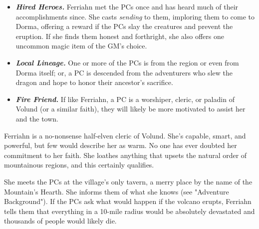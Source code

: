 \documentclass[10pt,a4paper,twoside,bg=print,twocolumn,openany,nodeprecatedcode]{dndbook}
\begin{document}
\begin{itemize}
\item \textbf{\textit{Hired Heroes.}} Ferriahn met the PCs once and has heard much of their accomplishments since. She casts \textit{sending} to them, imploring them to come to Dorma, offering a reward if the PCs slay the creatures and prevent the eruption. If she finds them honest and forthright, she also offers one uncommon magic item of the GM's choice.
\item \textbf{\textit{Local Lineage.}} One or more of the PCs is from the region or even from Dorma itself; or, a PC is descended from the adventurers who slew the dragon and hope to honor their ancestor's sacrifice.
\item \textbf{\textit{Fire Friend.}} If like Ferriahn, a PC is a worshiper, cleric, or paladin of Volund (or a similar faith), they will likely be more motivated to assist her and the town.
\end{itemize}

Ferriahn is a no-nonsense half-elven cleric of Volund. She's capable, smart, and powerful, but few would describe her as warm. No one has ever doubted her commitment to her faith. She loathes anything that upsets the natural order of mountainous regions, and this certainly qualifies.

She meets the PCs at the village's only tavern, a merry place by the name of the Mountain's Hearth. She informs them of what she knows (see "Adventure Background"). If the PCs ask what would happen if the volcano erupts, Ferriahn tells them that everything in a 10-mile radius would be absolutely devastated and thousands of people would likely die.
\end{document}

